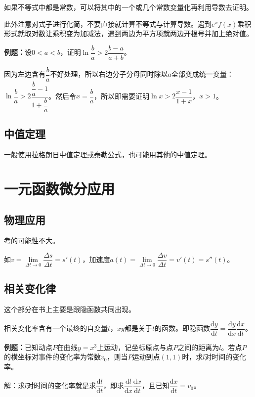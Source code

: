\documentclass[UTF8, 12pt]{ctexart}
\begin{document}
如果不等式中都是常数，可以将其中的一个或几个常数变量化再利用导数去证明。

此外注意对式子进行化简，不要直接就计算不等式与计算导数。遇到$e^xf(x)$乘积形式就取对数让乘积变为加减法，遇到两边为平方项就两边开根号并加上绝对值。

\textbf{例题：}设$0<a<b$，证明$\ln\dfrac{b}{a}>2\dfrac{b-a}{a+b}$。

因为左边含有$\dfrac{b}{a}$不好处理，所以右边分子分母同时除以$a$全部变成统一变量：$\ln\dfrac{b}{a}>2\dfrac{\dfrac{b}{a}-1}{1+\dfrac{b}{a}}$。然后令$x=\dfrac{b}{a}$，所以即需要证明$\ln x>2\dfrac{x-1}{1+x}$，$x>1$。

\subsection{中值定理}

一般使用拉格朗日中值定理或泰勒公式，也可能用其他的中值定理。

\section{一元函数微分应用}

\subsection{物理应用}

考的可能性不大。

如$v=\lim\limits_{\Delta t\to0}\dfrac{\Delta s}{\Delta t}=s'(t)$，加速度$a(t)=\lim\limits_{\Delta t\to0}\dfrac{\Delta v}{\Delta t}=v'(t)=s''(t)$。

\subsection{相关变化律}

这个部分在书上主要是跟隐函数共同出现。

相关变化率含有一个最终的自变量$t$，$xy$都是关于$t$的函数。即隐函数$\dfrac{\textrm{d}y}{\textrm{d}t}=\dfrac{\textrm{d}y}{\textrm{d}x}\dfrac{\textrm{d}x}{\textrm{d}t}$。

\textbf{例题：}已知动点$P$在曲线$y=x^3$上运动，记坐标原点与点$P$之间的距离为$l$。若点$P$的横坐标对事件的变化率为常数$v_0$，则当$P$运动到点$(1,1)$时，求$l$对时间的变化率。

解：求$l$对时间的变化率就是求$\dfrac{\textrm{d}l}{\textrm{d}t}$，即求$\dfrac{\textrm{d}l}{\textrm{d}x}\dfrac{\textrm{d}x}{\textrm{d}t}$，且已知$\dfrac{\textrm{d}x}{\textrm{d}t}=v_0$。
\end{document}
